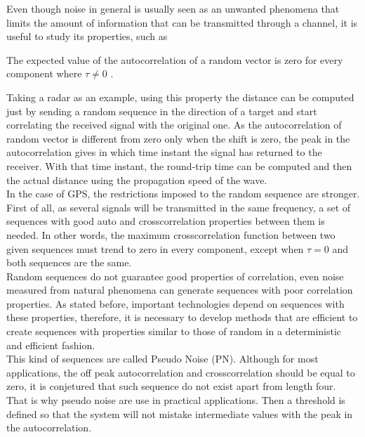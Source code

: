 Even though noise in general is usually seen as an unwanted phenomena that
limits the amount of information that can be transmitted through a
channel\cite{shannon_noise}, it is useful to study its properties, such as


\begin{property}
 The expected value of the autocorrelation of a random vector is zero for
 every component
  where $\tau \neq 0$ \cite{everett}.
\end{property}

Taking a radar as an example, using this property the distance can be computed
just by sending a random sequence in the direction of a target and start
correlating the received signal with the original one. As the autocorrelation
of random vector is different from zero only when the shift is zero, the peak
in the autocorrelation gives in which time instant the signal has returned to
the receiver. With that time instant, the round-trip time can be computed and then
the actual distance using the propagation speed of the wave.\\

In the case of GPS, the restrictions imposed to the random sequence are
stronger. First of all, as several signals will be transmitted in the same
frequency, a set of sequences with good auto and crosscorrelation
properties between them is needed. In other words, the maximum crosscorrelation
function between two given sequences must trend to zero in every component, except
when $\tau = 0$ and both sequences are the same.\\

Random sequences do not guarantee good properties of correlation, even noise
measured from natural phenomena can generate sequences with poor correlation
properties. As stated before, important technologies depend on sequences with
these properties, therefore, it is necessary to develop methods that are
efficient to create sequences with properties similar to those of random in a
deterministic and efficient fashion.\\

This kind of sequences are called Pseudo Noise (PN). Although for most
applications, the off peak autocorrelation and crosscorrelation should be equal to
zero, it is conjetured that such sequence do not exist apart from length four. That
is why pseudo noise are use in practical applications. Then a threshold is defined
so that the system will not mistake intermediate values with the peak in the
autocorrelation.


